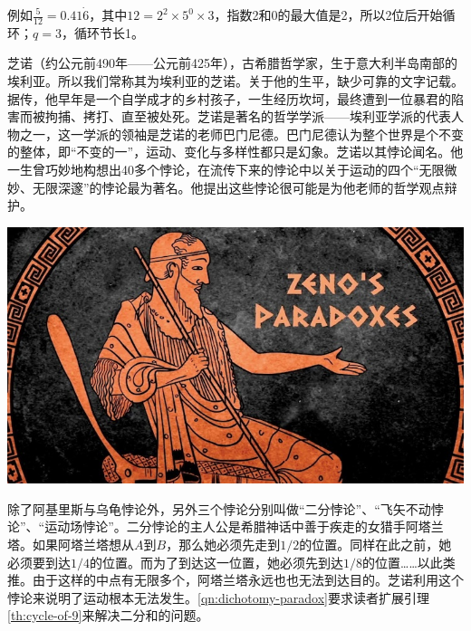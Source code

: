 \documentclass[b5paper]{ctexart}
\begin{document}
例如$\frac{5}{12} = 0.41\dot{6}$，其中$12 = 2^2 \times 5^0 \times 3$，指数2和0的最大值是2，所以2位后开始循环；$q = 3$，循环节长1。

\begin{mdframed}


芝诺（约公元前490年——公元前425年），古希腊哲学家，生于意大利半岛南部的埃利亚。所以我们常称其为埃利亚的芝诺。关于他的生平，缺少可靠的文字记载。据传，他早年是一个自学成才的乡村孩子，一生经历坎坷，最终遭到一位暴君的陷害而被拘捕、拷打、直至被处死\cite{HanXueTao16}。芝诺是著名的哲学学派——埃利亚学派的代表人物之一，这一学派的领袖是芝诺的老师巴门尼德。巴门尼德认为整个世界是个不变的整体，即“不变的一”，运动、变化与多样性都只是幻象。芝诺以其悖论闻名。他一生曾巧妙地构想出40多个悖论，在流传下来的悖论中以关于运动的四个“无限微妙、无限深邃”的悖论最为著名。他提出这些悖论很可能是为他老师的哲学观点辩护。

\begin{center}
 \includegraphics[scale=0.3]{img/zeno-paradox}
 \label{fig:Zeno-paradox}
\end{center}

除了阿基里斯与乌龟悖论外，另外三个悖论分别叫做“二分悖论”、“飞矢不动悖论”、“运动场悖论”。二分悖论的主人公是希腊神话中善于疾走的女猎手阿塔兰塔。如果阿塔兰塔想从$A$到$B$，那么她必须先走到$1/2$的位置。同样在此之前，她必须要到达$1/4$的位置。而为了到达这一位置，她必须先到达$1/8$的位置……以此类推。由于这样的中点有无限多个，阿塔兰塔永远也也无法到达目的。芝诺利用这个悖论来说明了运动根本无法发生。\cref{qn:dichotomy-paradox}要求读者扩展引理\ref{th:cycle-of-9}来解决二分和的问题。


\end{mdframed}
\end{document}
